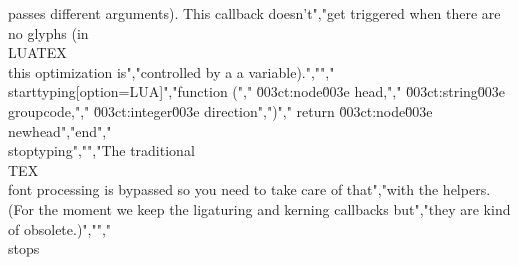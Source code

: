 passes different arguments). This callback doesn't","get triggered when there are no glyphs (in \\LUATEX\\ this optimization is","controlled by a a variable).","","\\starttyping[option=LUA]","function (","    \u003ct:node\u003e    head,","    \u003ct:string\u003e  groupcode,","    \u003ct:integer\u003e direction",")","    return \u003ct:node\u003e newhead","end","\\stoptyping","","The traditional \\TEX\\ font processing is bypassed so you need to take care of that","with the helpers. (For the moment we keep the ligaturing and kerning callbacks but","they are kind of obsolete.)","","\\stops